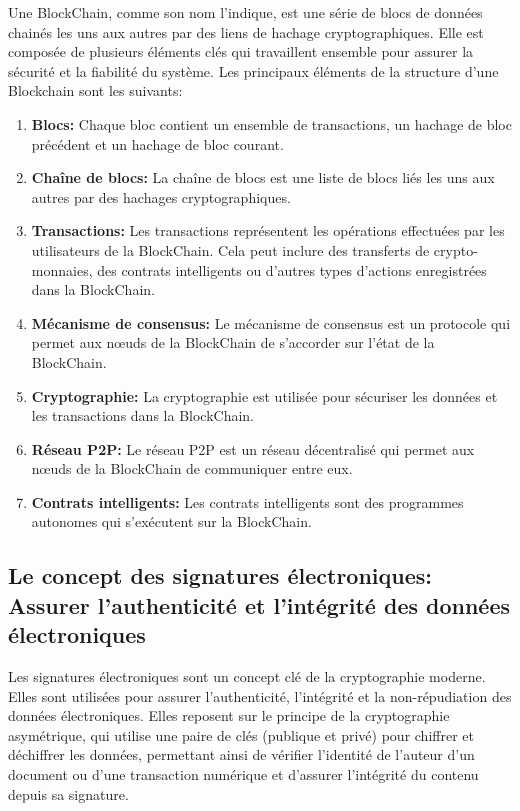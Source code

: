 \documentclass[journal, a4paper]{IEEEtran}
\begin{document}
			Une BlockChain, comme son nom l'indique, est une série de blocs de données chainés les uns aux autres par des liens de hachage cryptographiques.
		Elle est composée de plusieurs éléments clés qui travaillent ensemble pour assurer la sécurité et la fiabilité du système.
		Les principaux éléments de la structure d'une Blockchain sont les suivants:
			\begin{enumerate}
				\item \textbf{Blocs:} Chaque bloc contient un ensemble de transactions, un hachage de bloc précédent et un hachage de bloc courant.
				\item \textbf{Chaîne de blocs:} La chaîne de blocs est une liste de blocs liés les uns aux autres par des hachages cryptographiques.
				\item \textbf{Transactions:} Les transactions représentent les opérations effectuées par les utilisateurs de la BlockChain.
				Cela peut inclure des transferts de crypto-monnaies, des contrats intelligents ou d'autres types d'actions enregistrées dans la BlockChain.
				\item \textbf{Mécanisme de consensus:} Le mécanisme de consensus est un protocole qui permet aux nœuds de la BlockChain de s'accorder sur l'état de la BlockChain.
				\item \textbf{Cryptographie:} La cryptographie est utilisée pour sécuriser les données et les transactions dans la BlockChain.
				\item \textbf{Réseau P2P:} Le réseau P2P est un réseau décentralisé qui permet aux nœuds de la BlockChain de communiquer entre eux.
				\item \textbf{Contrats intelligents:} Les contrats intelligents sont des programmes autonomes qui s'exécutent sur la BlockChain.
			\end{enumerate}

	\subsection{\textbf{Le concept des signatures électroniques: Assurer l'authenticité et l'intégrité des données électroniques}}\label{subsec:signature}
			Les signatures électroniques sont un concept clé de la cryptographie moderne.
		Elles sont utilisées pour assurer l'authenticité, l'intégrité et la non-répudiation des données électroniques.
		Elles reposent sur le principe de la cryptographie asymétrique, qui utilise une paire de clés (publique et privé) pour chiffrer et déchiffrer les données,
		permettant ainsi de vérifier l'identité de l'auteur d'un document ou d'une transaction numérique et d'assurer l'intégrité du contenu depuis sa signature.
\end{document}
